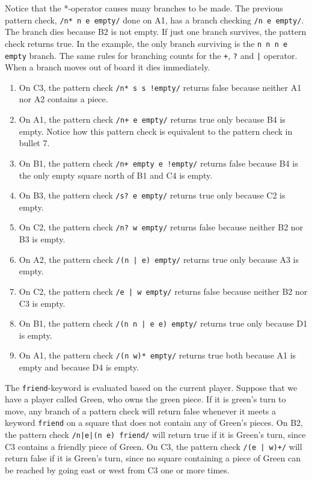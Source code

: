 Notice that the *-operator causes many branches to be made. The previous pattern
check, \texttt{/n* n e empty/} done on A1, has a branch checking \texttt{/n e
empty/}. The branch dies because B2 is not empty. If just one branch survives,
the pattern check returns true. In the example, the only branch surviving is the
\texttt{n n n e empty} branch. The same rules for branching counts for the
\texttt{+}, \texttt{?} and \texttt{|} operator. When a branch moves out of board
it dies immediately.

\begin{enumerate}
\item On C3, the pattern check \texttt{/n* s s !empty/} returns false because
  neither A1 nor A2 contains a piece.
\item On A1, the pattern check \texttt{/n+ e empty/} returns true only because
  B4 is empty. Notice how this pattern check is equivalent to the pattern check
  in bullet 7.
\item On B1, the pattern check \texttt{/n+ empty e !empty/} returns false
  because B4 is the only empty square north of B1 and C4 is empty.
\item On B3, the pattern check \texttt{/s? e empty/} returns true only because
  C2 is empty. 
\item On C2, the pattern check \texttt{/n? w empty/} returns false because
  neither B2 nor B3 is empty.
\item On A2, the pattern check \texttt{/(n | e) empty/} returns true only because A3 is empty.
\item On C2, the pattern check \texttt{/e | w empty/} returns false because
  neither B2 nor C3 is empty.
\item On B1, the pattern check \texttt{/(n n | e e) empty/} returns true only
  because D1 is empty.
\item On A1, the pattern check \texttt{/(n w)* empty/} returns true both because
  A1 is empty and because D4 is empty.
\end{enumerate}

The \texttt{friend}-keyword is evaluated based on the current player. Suppose
that we have a player called Green, who owns the green piece. If it is green's
turn to move, any branch of a pattern check will return false whenever it meets
a keyword \texttt{friend} on a square that does not contain any of Green's
pieces.  On B2, the pattern check \texttt{/n|e|(n e) friend/} will return true
if it is Green's turn, since C3 contains a friendly piece of Green.  On C3, the
pattern check \texttt{/(e | w)+/} will return false if it is Green's turn, since
no square containing a piece of Green can be reached by going east or west from
C3 one or more times.

